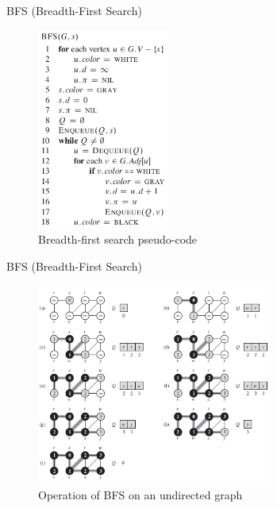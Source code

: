 \documentclass[ignorenonframetext,]{beamer}
\begin{document}
\begin{frame}{BFS (Breadth-First Search)}
\protect\hypertarget{bfs-breadth-first-search-1}{}

\begin{figure}
\centering
\includegraphics[width=\textwidth,height=2.60417in]{breadth-first-search-pseudocode.png}
\caption{Breadth-first search pseudo-code}
\end{figure}

\end{frame}

\begin{frame}{BFS (Breadth-First Search)}
\protect\hypertarget{bfs-breadth-first-search-2}{}

\begin{figure}
\centering
\includegraphics[width=\textwidth,height=2.60417in]{bfs-undirected-graph.png}
\caption{Operation of BFS on an undirected graph}
\end{figure}

\end{frame}
\end{document}
